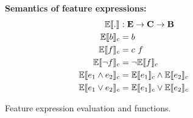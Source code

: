 \begin{figure}
\textbf{Semantics of feature expressions:}
\begin{alignat*}{1}
\fSem [] . &: \ffSet \to \confSet \to \bSet\\
\fSem \bTag &= \bTag\\
\fSem \fName &= \config \ \fName\\
\fSem {\neg \fName} &= \neg \fSem \fName\\
\fSem {\annd \dimMeta} &= \fSem {\dimMeta_1} \wedge \fSem {\dimMeta_2}\\
\fSem {\orr \dimMeta} &= \fSem {\dimMeta_1} \vee \fSem {\dimMeta_2}\\
\end{alignat*}

\begin{comment}

\medskip
\textbf{Functions over feature expressions:}
\begin{alignat*}{1}
\mathit{sat}, \mathit{taut} &: \ffSet \to \bSet \\
\sat \dimMeta = \t &\textit{ iff \ } \exists \config \in \confSet: \fSem \dimMeta = \t\\
\taut \dimMeta = \t &\textit{ iff \ } \forall \config \in \confSet: \fSem \dimMeta = \t
\end{alignat*}
\end{comment}

\caption{Feature expression evaluation and functions.}
\label{fig:fexp-eval}
\end{figure}


